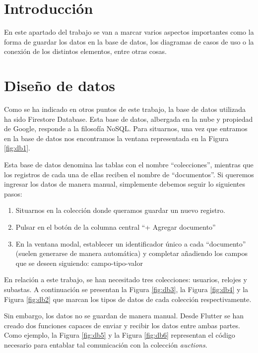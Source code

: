 
\section{Introducción}

	En este apartado del trabajo se van a marcar varios aspectos importantes como la forma de guardar los datos en la base de datos, los diagramas de casos de uso o la conexión de los distintos elementos, entre otras cosas.

\section{Diseño de datos}

	Como se ha indicado en otros puntos de este trabajo, la base de datos utilizada ha sido Firestore Database. Esta base de datos, albergada en la nube y propiedad de Google, responde a la filosofía NoSQL. Para situarnos, una vez que entramos en la base de datos nos encontramos la ventana representada en la Figura \ref{fig:db1}.
	

	Esta base de datos denomina las tablas con el nombre ``colecciones'', mientras que los registros de cada una de ellas reciben el nombre de ``documentos''. Si queremos ingresar los datos de manera manual, simplemente debemos seguir lo siguientes pasos:
	\begin{enumerate}
		\item Situarnos en la colección donde queramos guardar un nuevo registro.
		\item Pulsar en el botón de la columna central ``+ Agregar documento''
		\item En la ventana modal, establecer un identificador único a cada ``documento'' (suelen generarse de manera automática) y completar añadiendo los campos que se deseen siguiendo: campo-tipo-valor
	\end{enumerate}
	
	En relación a este trabajo, se han necesitado tres colecciones: usuarios, relojes y subastas. A continuación se presentan la Figura \ref{fig:db3}, la Figura \ref{fig:db4} y la Figura \ref{fig:db2} que marcan los tipos de datos de cada colección respectivamente.
	

	Sin embargo, los datos no se guardan de manera manual. Desde Flutter se han creado dos funciones capaces de enviar y recibir los datos entre ambas partes. Como ejemplo, la Figura \ref{fig:db5} y la Figura \ref{fig:db6} representan el código necesario para entablar tal comunicación con la colección \emph{auctions}.
	
